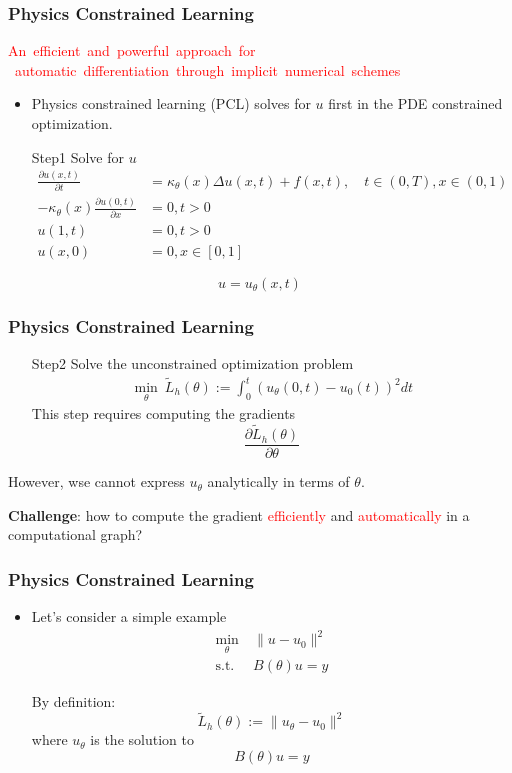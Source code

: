 \documentclass{beamer}
\begin{document}
\begin{frame}
	\frametitle{Physics Constrained Learning}
	\begin{center}
\textcolor{red}{\mbox{An efficient and powerful approach for} \\\mbox{ automatic differentiation through implicit numerical schemes}}
	\end{center}
	\begin{itemize}
		\item Physics constrained learning (PCL) solves for $u$ first in the PDE constrained optimization. 
	\end{itemize}
	\begin{itemize}
\item[Step1] Solve for $u$
\begin{align*}
 \frac{\partial u(x, t)}{\partial t} &= {\kappa_\theta(x)}\Delta u(x, t) + f(x, t), \quad t\in (0,T), x\in (0,1) \\
-{\kappa_\theta(x)}\frac{\partial u(0,t)}{\partial x} &= 0, t>0\\
 u(1, t) &= 0, t>0\\
 u(x, 0) &= 0, x\in [0,1]
\end{align*}
	\end{itemize}
	$$\boxed{u = u_\theta(x, t)}$$
\end{frame}


\begin{frame}
	\frametitle{Physics Constrained Learning}
	
	\begin{itemize}
\item[Step2] Solve the unconstrained optimization problem
\begin{align*}
 \min_\theta \ \tilde L_h(\theta) := \int_{0}^t ( u_\theta(0, t)- u_0(t))^2 dt
\end{align*} 
This step requires computing the gradients
$$\boxed{\frac{\partial \tilde L_h(\theta)}{\partial \theta}}$$
\end{itemize}

However, wse cannot express $u_\theta$ analytically in terms of $\theta$.

\textbf{Challenge}: how to compute the gradient \textcolor{red}{efficiently} and \textcolor{red}{automatically} in a computational graph?

\end{frame}



\begin{frame}
	\frametitle{Physics Constrained Learning}
\begin{itemize}
	\item Let's consider a simple example
	\begin{align*}
		\min_\theta & \ \|u-u_0\|^2\\
		\mathrm{s.t.} & \ B(\theta) u = y 
	\end{align*}
	
	By definition:
	$$\tilde L_h(\theta) := \|u_\theta-u_0\|^2$$
	where $u_\theta$ is the solution to 
	$$ B(\theta) u = y $$
\end{itemize}	

\end{frame}
\end{document}
